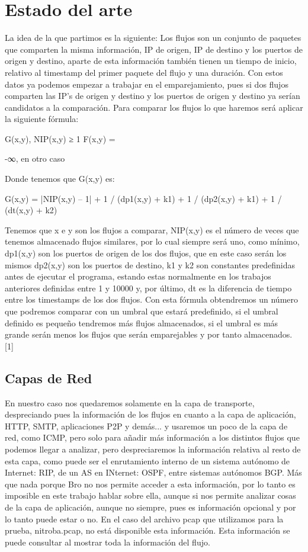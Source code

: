 \chapter{Estado del arte}

La idea de la que partimos es la siguiente: 
Los flujos son un conjunto de paquetes que comparten la misma 
información, IP de origen, IP de destino y los puertos de origen 
y destino, aparte de esta información también tienen un tiempo de 
inicio, relativo al timestamp del primer paquete del flujo y una 
duración. Con estos datos ya podemos empezar a trabajar en el 
emparejamiento, pues si dos flujos comparten las IP’s de origen y 
destino y los puertos de origen y destino ya serían candidatos a 
la comparación. Para comparar los flujos lo que haremos será 
aplicar la siguiente fórmula:

			  { G(x,y), NIP(x,y) ≥ 1   
	F(x,y) = {
    		  { -∞, en otro caso


Donde tenemos que G(x,y) es:

G(x,y) = |NIP(x,y) – 1| + 1 / (dp1(x,y) + k1) + 1 / (dp2(x,y) + k1) + 1 / (dt(x,y) + k2)

Tenemos que x e y son los flujos a comparar, NIP(x,y) es el número 
de veces que tenemos almacenado flujos similares, por lo cual siempre 
será uno, como mínimo, dp1(x,y) son los puertos de origen de los dos 
flujos, que en este caso serán los mismos dp2(x,y) son los puertos de 
destino, k1 y k2 son constantes predefinidas antes de ejecutar el programa, 
estando estas normalmente en los trabajos anteriores definidas entre 
1 y 10000 y, por último, dt es la diferencia de tiempo entre los timestamps 
de los dos flujos.  
\intro
Con esta fórmula obtendremos un número que podremos comparar con un 
umbral que estará predefinido, si el umbral definido es pequeño 
tendremos más flujos almacenados, si el umbral es más grande serán 
menos los flujos que serán emparejables y por tanto almacenados. [1]


\section{Capas de Red}

En nuestro caso nos quedaremos solamente en la capa de transporte, 
despreciando pues la información de los flujos en cuanto a la capa 
de aplicación, HTTP, SMTP, aplicaciones P2P y demás... y usaremos 
un poco de la capa de red, como ICMP, pero solo para añadir más 
información a los distintos flujos que podemos llegar a analizar, 
pero despreciaremos la información relativa al resto de esta capa, 
como puede ser el enrutamiento interno de un sistema autónomo de 
Internet: RIP, de un AS en INternet: OSPF, entre sistemas autónomos 
BGP. Más que nada porque Bro no nos permite acceder a esta información, 
por lo tanto es imposible en este trabajo hablar sobre ella, aunque si 
nos permite analizar cosas de la capa de aplicación, aunque no siempre, 
pues es información opcional y por lo tanto puede estar o no. En el 
caso del archivo pcap que utilizamos para la prueba, nitroba.pcap, 
no está disponible esta información. Esta información se puede consultar 
al mostrar toda la información del flujo.

}}}
